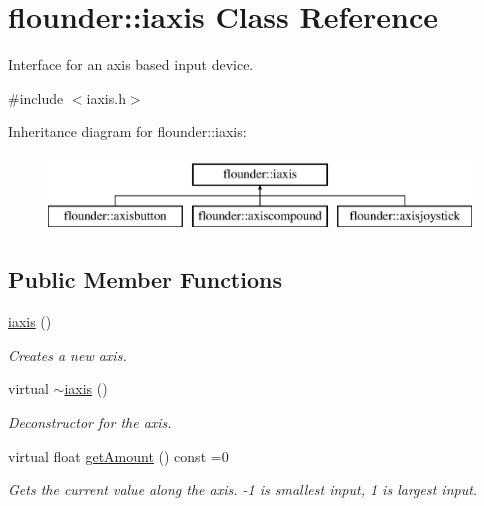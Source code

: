 \hypertarget{classflounder_1_1iaxis}{}\section{flounder\+:\+:iaxis Class Reference}
\label{classflounder_1_1iaxis}


Interface for an axis based input device.  




{\ttfamily \#include $<$iaxis.\+h$>$}

Inheritance diagram for flounder\+:\+:iaxis\+:\begin{figure}[H]
\begin{center}
\leavevmode
\includegraphics[height=2.000000cm]{classflounder_1_1iaxis}
\end{center}
\end{figure}
\subsection*{Public Member Functions}
\begin{DoxyCompactItemize}
\item 
\hyperlink{classflounder_1_1iaxis_a0f181144a1e6cd74008fdf0dbff1db4c}{iaxis} ()
\begin{DoxyCompactList}\small\item\em Creates a new axis. \end{DoxyCompactList}\item 
virtual \hyperlink{classflounder_1_1iaxis_ad0c72fa9b05f3151dbefc48ce7249f66}{$\sim$iaxis} ()
\begin{DoxyCompactList}\small\item\em Deconstructor for the axis. \end{DoxyCompactList}\item 
virtual float \hyperlink{classflounder_1_1iaxis_a990ecb5ffa5ec07b3d5e2e4016b2e4a0}{get\+Amount} () const =0
\begin{DoxyCompactList}\small\item\em Gets the current value along the axis. -\/1 is smallest input, 1 is largest input. \end{DoxyCompactList}\end{DoxyCompactItemize}


